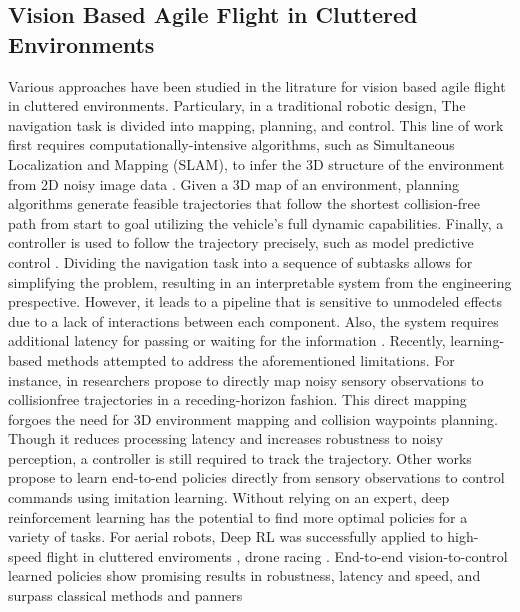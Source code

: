 \documentclass{article}
\begin{document}
\subsection{Vision Based Agile Flight in Cluttered Environments}
Various approaches have been studied in the litrature for vision based agile flight in cluttered environments. Particulary, in a traditional robotic design, The navigation task is divided into mapping, planning, and control. This line of work first requires computationally-intensive algorithms, such as Simultaneous Localization and Mapping (SLAM), to infer the 3D structure of the environment from 2D noisy image data \cite{zhouSwarmMicroFlying2022, scaramuzzaVisionControlledMicroFlying2014}. Given a 3D map of an environment, planning algorithms generate feasible trajectories that follow the shortest collision-free path from start to goal utilizing the vehicle’s full dynamic capabilities. Finally, a controller is used to follow the trajectory precisely, such as model predictive control \cite{falangaPAMPCPerceptionAwareModel2018}. Dividing the navigation task into a sequence of subtasks allows for simplifying the problem, resulting in an interpretable system from the engineering prespective. However, it leads to a pipeline that is sensitive to unmodeled effects due to a lack of interactions between each component. Also, the system requires additional latency for passing or waiting for the information \cite{loquercioLearningHighSpeedFlight2021}. Recently, learning-based methods attempted to address the aforementioned limitations. For instance, in \cite{loquercioLearningHighSpeedFlight2021} researchers propose to directly map noisy sensory observations to collisionfree trajectories in a receding-horizon fashion. This direct mapping forgoes the need for 3D environment mapping and collision waypoints planning. Though it reduces processing latency and increases robustness to noisy perception, a controller is still required to track the trajectory. Other works propose to learn end-to-end policies directly from sensory observations to control commands using imitation learning. Without relying on an expert, deep reinforcement learning has the potential to find more optimal policies for a variety of tasks. For aerial robots, Deep RL was successfully applied to high-speed flight in cluttered enviroments \cite{songLearningPerceptionAwareAgile2023}, drone racing \cite{kaufmannChampionlevelDroneRacing2023}. End-to-end vision-to-control learned policies show promising results in robustness, latency and speed, and surpass classical methods and panners 
\end{document}

